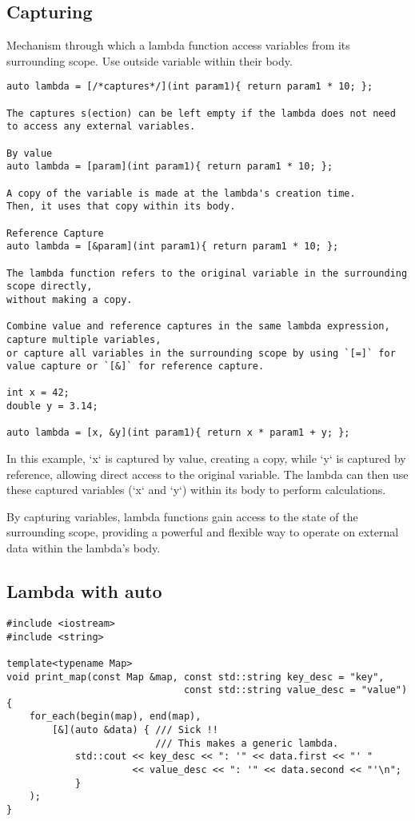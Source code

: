 \subsection{Capturing}

Mechanism through which a lambda function access variables from its surrounding scope.
Use outside variable within their body.

\begin{verbatim}
auto lambda = [/*captures*/](int param1){ return param1 * 10; };

The captures s(ection) can be left empty if the lambda does not need to access any external variables.

By value
auto lambda = [param](int param1){ return param1 * 10; };

A copy of the variable is made at the lambda's creation time.
Then, it uses that copy within its body. 

Reference Capture
auto lambda = [&param](int param1){ return param1 * 10; };

The lambda function refers to the original variable in the surrounding scope directly,
without making a copy. 

Combine value and reference captures in the same lambda expression, 
capture multiple variables, 
or capture all variables in the surrounding scope by using `[=]` for value capture or `[&]` for reference capture.

int x = 42;
double y = 3.14;

auto lambda = [x, &y](int param1){ return x * param1 + y; };
\end{verbatim}

In this example, `x` is captured by value,
creating a copy, while `y` is captured by reference,
allowing direct access to the original variable.
The lambda can then use these captured variables (`x` and `y`)
within its body to perform calculations.

By capturing variables, lambda functions gain access to the state of the surrounding scope, providing a powerful and flexible way to operate on external data within the lambda's body.

\subsection{Lambda with auto}
\begin{verbatim}
#include <iostream>
#include <string>

template<typename Map>
void print_map(const Map &map, const std::string key_desc = "key",
                               const std::string value_desc = "value")
{
    for_each(begin(map), end(map),
        [&](auto &data) { /// Sick !!
                          /// This makes a generic lambda.
            std::cout << key_desc << ": '" << data.first << "' "
                      << value_desc << ": '" << data.second << "'\n";
            }
    );
}
\end{verbatim}

